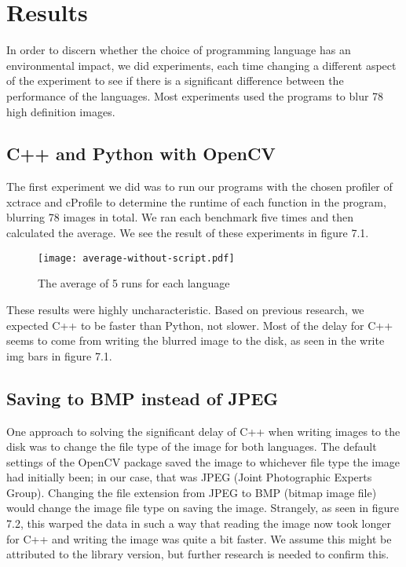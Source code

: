 \chapter{Results}
In order to discern whether the choice of programming language has an environmental impact, we did experiments, each time changing a different aspect of the experiment to see if there is a significant difference between the performance of the languages. Most experiments used the programs to blur 78 high definition images.

\section{C++ and Python with OpenCV }
The first experiment we did was to run our programs with the chosen profiler of xctrace and cProfile to determine the runtime of each function in the program, blurring 78 images in total. We ran each benchmark five times and then calculated the average. We see the result of these experiments in figure 7.1.

\begin{figure}[H]
	\centering
	\texttt{[image: average-without-script.pdf]}
	\caption{The average of 5 runs for each language}
	\label{figure:average-78img}
\end{figure}

These results were highly uncharacteristic. Based on previous research, we expected C++ to be faster than Python, not slower. Most of the delay for C++ seems to come from writing the blurred image to the disk, as seen in the write img bars in figure 7.1.

\section{Saving to BMP instead of JPEG}
One approach to solving the significant delay of C++ when writing images to the disk was to change the file type of the image for both languages. The default settings of the OpenCV package saved the image to whichever file type the image had initially been; in our case, that was JPEG (Joint Photographic Experts Group). Changing the file extension from JPEG to BMP (bitmap image file) would change the image file type on saving the image. Strangely, as seen in figure 7.2, this warped the data in such a way that reading the image now took longer for C++ and writing the image was quite a bit faster. We assume this might be attributed to the library version, but further research is needed to confirm this.

